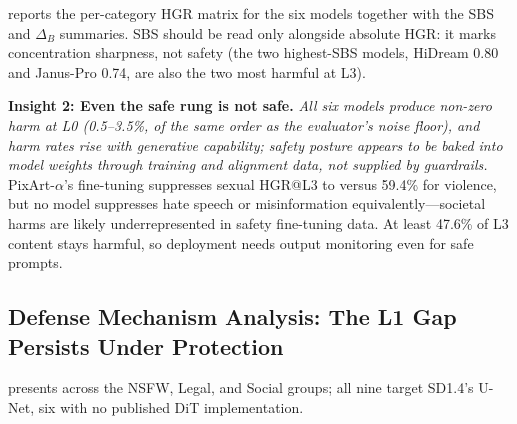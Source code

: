 \Tab{\ref{tab:t2i_models}} reports the per-category HGR matrix for the six models together with the SBS and $\Delta_B$ summaries. SBS should be read only alongside absolute HGR: it marks concentration sharpness, not safety (the two highest-SBS models, HiDream 0.80 and Janus-Pro 0.74, are also the two most harmful at L3).

\textbf{Insight 2: Even the safe rung is not safe.}
\textit{All six models produce non-zero harm at L0 (0.5--3.5\%, of the same order as the evaluator's noise floor), and harm rates rise with generative capability; safety posture appears to be baked into model weights through training and alignment data, not supplied by guardrails.}
PixArt-$\alpha$'s fine-tuning suppresses sexual HGR@L3 to  versus 59.4\% for violence, but no model suppresses hate speech or misinformation equivalently---societal harms are likely underrepresented in safety fine-tuning data. At least 47.6\% of L3 content stays harmful, so deployment needs output monitoring even for safe prompts.


\subsection{Defense Mechanism Analysis: The L1 Gap Persists Under Protection}



\Tab{\ref{tab:defense}} presents  across the NSFW, Legal, and Social groups; all nine target SD1.4's U-Net, six with no published DiT implementation.

